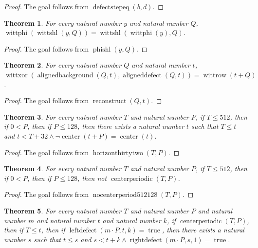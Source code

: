\documentclass[11pt]{article}
\newtheorem{theorem}{Theorem}[section]
\theoremstyle{definition}
\begin{document}
\begin{proof}
The goal follows from \(\operatorname{defectstepeq}(b, d)\).
\end{proof}
\begin{theorem}
\label{ll:observations:phi-shl}
For every natural number \(y\) and natural number \(Q\), \(\operatorname{wittphi}(\operatorname{wittshl}(y, Q)) = \operatorname{wittshl}(\operatorname{wittphi}(y), Q)\).
\end{theorem}
\begin{proof}
The goal follows from \(\operatorname{phishl}(y, Q)\).
\end{proof}
\begin{theorem}
\label{ll:observations:reconstruct}
For every natural number \(Q\) and natural number \(t\), \(\operatorname{wittxor}(\operatorname{alignedbackground}(Q, t), \operatorname{aligneddefect}(Q, t)) = \operatorname{wittrow}(t + Q)\).
\end{theorem}
\begin{proof}
The goal follows from \(\operatorname{reconstruct}(Q, t)\).
\end{proof}
\begin{theorem}
\label{ll:observations:horizon-thirty-two}
For every natural number \(T\) and natural number \(P\), if \(T \le 512\), then if \(0 < P\), then if \(P \le 128\), then there exists a natural number \(t\) such that \(T \le t\) and \(t < T + 32 \land \lnot\operatorname{center}(t + P) = \operatorname{center}(t)\).
\end{theorem}
\begin{proof}
The goal follows from \(\operatorname{horizonthirtytwo}(T, P)\).
\end{proof}
\begin{theorem}
\label{ll:observations:no-center-period-512-128}
For every natural number \(T\) and natural number \(P\), if \(T \le 512\), then if \(0 < P\), then if \(P \le 128\), then not \(\operatorname{centerperiodic}(T, P)\).
\end{theorem}
\begin{proof}
The goal follows from \(\operatorname{nocenterperiod512128}(T, P)\).
\end{proof}
\begin{theorem}
\label{ll:observations:left-defect-sourced}
For every natural number \(T\) and natural number \(P\) and natural number \(m\) and natural number \(t\) and natural number \(k\), if \(\operatorname{centerperiodic}(T, P)\), then if \(T \le t\), then if \(\operatorname{leftdefect}(m \cdot P, t, k) = \operatorname{true}\), then there exists a natural number \(s\) such that \(t \le s\) and \(s < t + k \land \operatorname{rightdefect}(m \cdot P, s, 1) = \operatorname{true}\).
\end{theorem}
\end{document}
